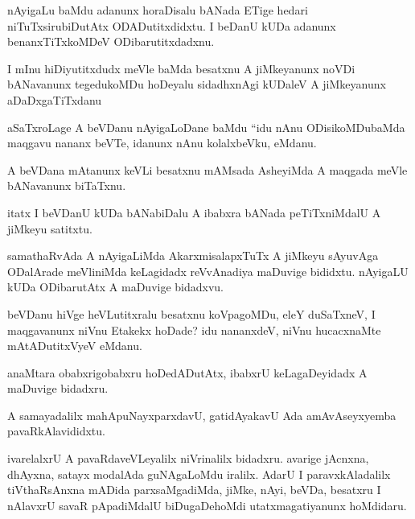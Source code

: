 \documentclass{article}
\begin{document}
\begin{mn}
nAyigaLu baMdu adanunx horaDisalu bANada ETige hedari niTuTxsirubiDutAtx ODADutitxdidxtu.  
I beDanU kUDa adanunx benanxTiTxkoMDeV ODibarutitxdadxnu. 
\end{mn}

\begin{mn}
I mInu hiDiyutitxdudx meVle baMda besatxnu A jiMkeyanunx noVDi bANavanunx 
tegedukoMDu hoDeyalu sidadhxnAgi kUDaleV A jiMkeyanunx aDaDxgaTiTxdanu
\end{mn}

\begin{mn}
aSaTxroLage A beVDanu nAyigaLoDane baMdu ``idu nAnu ODisikoMDubaMda maqgavu 
nananx beVTe, idanunx nAnu kolalxbeVku, eMdanu.
\end{mn}

\begin{mn}
A beVDana mAtanunx keVLi besatxnu mAMsada AsheyiMda A maqgada meVle bANavanunx biTaTxnu.
\end{mn}

\begin{mn}
itatx I beVDanU kUDa bANabiDalu A ibabxra bANada peTiTxniMdalU A jiMkeyu satitxtu.
\end{mn}

\begin{mn}
samathaRvAda A nAyigaLiMda AkarxmisalapxTuTx A jiMkeyu sAyuvAga ODalArade meVliniMda 
keLagidadx reVvAnadiya maDuvige bididxtu. nAyigaLU kUDa ODibarutAtx A maDuvige bidadxvu.
\end{mn}

\begin{mn}
beVDanu hiVge heVLutitxralu besatxnu koVpagoMDu, eleY duSaTxneV, I maqgavanunx 
niVnu Etakekx hoDade? idu nananxdeV, niVnu hucacxnaMte mAtADutitxVyeV eMdanu. 
\end{mn}

\begin{mn}
anaMtara obabxrigobabxru hoDedADutAtx, ibabxrU keLagaDeyidadx A maDuvige bidadxru.
\end{mn}

\begin{mn}
A samayadalilx mahApuNayxparxdavU, gatidAyakavU Ada amAvAseyxyemba pavaRkAlavididxtu.
\end{mn}

\begin{mn}
ivarelalxrU A pavaRdaveVLeyalilx niVrinalilx bidadxru. avarige jAcnxna, dhAyxna, 
satayx modalAda guNAgaLoMdu iralilx.  AdarU I paravxkAladalilx tiVthaRsAnxna 
mADida parxsaMgadiMda, jiMke, nAyi, beVDa, besatxru I nAlavxrU savaR pApadiMdalU 
biDugaDehoMdi utatxmagatiyanunx hoMdidaru.
\end{mn}
\end{document}
